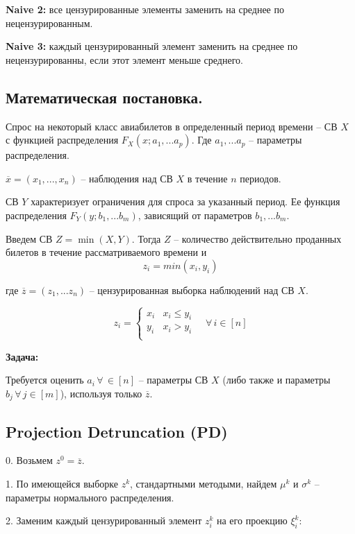 \documentclass[12pt, reqno]{article}
\theoremstyle{definition}
\theoremstyle{definition}
\theoremstyle{definition}
\theoremstyle{definition}
\theoremstyle{definition}
\theoremstyle{definition}
\theoremstyle{definition}
\theoremstyle{definition}
\theoremstyle{definition}
\begin{document}
		\textbf{Naive 2:} все цензурированные элементы заменить на среднее по нецензурированным.
		
		\textbf{Naive 3:} каждый цензурированный элемент заменить на среднее по нецензурированны, если этот элемент меньше среднего.
		
		\subsection{Математическая постановка.}
		
		Спрос на некоторый класс авиабилетов в определенный период времени -- СВ $X$ с функцией распределения $F_X(x; a_1, ... a_p)$. Где $a_1, ... a_p$ -- параметры распределения.
		
		$\overline{x} = (x_1, ... , x_n)$ -- наблюдения над СВ $X$ в течение $n$ периодов.
		
		СВ $Y$ характеризует ограничения для спроса за указанный период. Ее функция распределения $F_Y(y; b_1, ... b_m)$, зависящий от параметров $b_1, ... b_m$.
		
		Введем СВ $Z = \min(X, Y)$. Тогда $Z$ -- количество действительно проданных билетов в течение рассматриваемого времени и
		$$z_i = min(x_i, y_i)$$
	
		где $\overline{z} = (z_1, ... z_n)$ -- цензурированная выборка наблюдений над СВ $X$.
		
		$$
		z_i =
		\begin{cases}
			x_i & x_i \leq y_i\\
			y_i & x_i > y_i   \\
		\end{cases}
		\quad \forall\, i \in [n]
		$$
		
		\textbf{Задача:}
		
		Требуется оценить $a_i\,\forall\,\in [n]$ -- параметры СВ $X$ (либо также и параметры $b_j\,\forall\,j \in [m]$), используя только $\overline{z}$.
		
		
		\subsection{Projection Detruncation (PD)}
		
		0. Возьмем $z^0 = \overline{z}$.
		
		1. По имеющейся выборке $z^k$, стандартными методыми, найдем $\mu^{k}$ и $\sigma^{k}$ -- параметры нормального распределения.
		
		2. Заменим каждый цензурированный элемент $z_i^{k}$ на его проекцию $\xi_i^{k}$:
		
\end{document}
